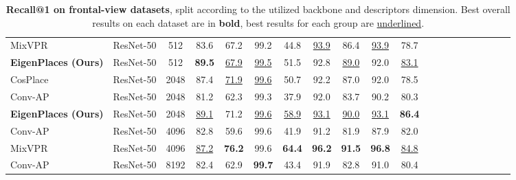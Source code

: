\documentclass[10pt,twocolumn,letterpaper]{article}
\begin{document}
\begin{table*}
\begin{center}
\begin{adjustbox}{width=0.8\linewidth}
\begin{tabular}{lccccccccccccccccccc}
MixVPR \cite{Alibey_2023_mixvpr}         & ResNet-50 &  512 &           83.6 &           67.2 &           99.2 &           44.8 &\underline{93.9}&           86.4 &\underline{93.9}&           78.7 \\
\textbf{EigenPlaces (Ours)}              & ResNet-50 &  512 &  \textbf{89.5} &\underline{67.9}&\underline{99.5}&           51.5 &           92.8 &\underline{89.0}&           92.0 &\underline{83.1}\\
\hline
CosPlace \cite{Berton_2022_cosPlace}     & ResNet-50 & 2048 &           87.4 &\underline{71.9}&\underline{99.6}&           50.7 &           92.2 &           87.0 &           92.0 &           78.5 \\
Conv-AP \cite{Alibey_2022_gsvcities}     & ResNet-50 & 2048 &           81.2 &           62.3 &           99.3 &           37.9 &           92.0 &           83.7 &           90.2 &           80.3 \\
\textbf{EigenPlaces (Ours)}              & ResNet-50 & 2048 &\underline{89.1}&           71.2 &\underline{99.6}&\underline{58.9}&\underline{93.1}&\underline{90.0}&\underline{93.1}&  \textbf{86.4} \\
\hline
Conv-AP \cite{Alibey_2022_gsvcities}     & ResNet-50 & 4096 &           82.8 &           59.6 &           99.6 &           41.9 &           91.2 &           81.9 &           87.9 &           82.0 \\
MixVPR \cite{Alibey_2023_mixvpr}         & ResNet-50 & 4096 &\underline{87.2}&  \textbf{76.2} &           99.6 &  \textbf{64.4} &  \textbf{96.2} &  \textbf{91.5} &  \textbf{96.8} &\underline{84.8}\\
Conv-AP \cite{Alibey_2022_gsvcities}     & ResNet-50 & 8192 &           82.4 &           62.9 &  \textbf{99.7} &           43.4 &           91.9 &           82.8 &           91.0 &           80.4 \\




\bottomrule
\end{tabular}
\end{adjustbox}
\end{center}
\caption{\textbf{Recall@1 on frontal-view datasets}, split according to the utilized backbone and descriptors dimension. Best overall results on each dataset are in \textbf{bold}, best results for each group are \underline{underlined}.}
\label{tab:frontal_view}
\end{table*}
 
\end{document}
